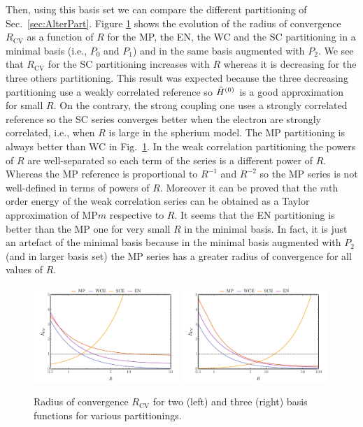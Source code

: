 \documentclass[11pt,a4paper]{article}
\newcommand{\hH}{\Hat{H}}
\begin{document}
Then, using this basis set we can compare the different partitioning of Sec.~\ref{sec:AlterPart}. Figure \ref{fig:RadiusPartitioning} shows the evolution of the radius of convergence $R_{\text{CV}}$ as a function of $R$ for the MP, the EN, the WC and the SC partitioning in a minimal basis (i.e., $P_0$ and $P_1$) and in the same basis augmented with $P_2$. We see that $R_{\text{CV}}$ for the SC partitioning increases with $R$ whereas it is decreasing for the three others partitioning. This result was expected because the three decreasing partitioning use a weakly correlated reference so $\hH^{(0)}$ is a good approximation for small $R$. On the contrary, the strong coupling one uses a strongly correlated reference so the SC series converges better when the electron are strongly correlated, i.e., when $R$ is large in the spherium model.
The MP partitioning is always better than WC in Fig.~\ref{fig:RadiusPartitioning}. In the weak correlation partitioning the powers of $R$ are well-separated so each term of the series is a different power of $R$. Whereas the MP reference is proportional to $R^{-1}$ and $R^{-2}$ so the MP series is not well-defined in terms of powers of $R$. Moreover it can be proved that the $m$th order energy of the weak correlation series can be obtained as a Taylor approximation of MP$m$ respective to $R$. It seems that the EN partitioning is better than the MP one for very small $R$ in the minimal basis. In fact, it is just an artefact of the minimal basis because in the minimal basis augmented with $P_2$ (and in larger basis set) the MP series has a greater radius of convergence for all values of $R$.

\begin{figure}
    \centering
    \includegraphics[width=0.49\textwidth]{PartitioningRCV2.pdf}
    \includegraphics[width=0.49\textwidth]{PartitioningRCV3.pdf}
    \caption{Radius of convergence $R_{\text{CV}}$ for two (left) and three (right) basis functions for various partitionings.}
    \label{fig:RadiusPartitioning}
\end{figure}
\end{document}
